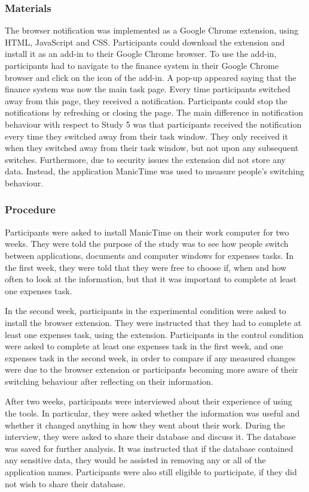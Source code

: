 \subsubsection{Materials}
The browser notification was implemented as a Google Chrome extension, using HTML, JavaScript and CSS. Participants could download the extension and install it as an add-in to their Google Chrome browser. To use the add-in, participants had to navigate to the finance system in their Google Chrome browser and click on the icon of the add-in. A pop-up appeared saying that the finance system was now the main task page. Every time participants switched away from this page, they received a notification. Participants could stop the notifications by refreshing or closing the page. 
The main difference in notification behaviour with respect to Study 5 was that participants received the notification every time they switched away from their task window. They only received it when they switched away from their task window, but not upon any subsequent switches. Furthermore, due to security issues the extension did not store any data. Instead, the application ManicTime was used to measure people's switching behaviour. 

\subsubsection{Procedure}
Participants were asked to install ManicTime on their work computer for two weeks. They were told the purpose of the study was to see how people switch between applications, documents and computer windows for expenses tasks. In the first week, they were told that they were free to choose if, when and how often to look at the information, but that it was important to complete at least one expenses task.

In the second week, participants in the experimental condition were asked to install the browser extension. They were instructed that they had to complete at least one expenses task, using the extension. Participants in the control condition were asked to complete at least one expenses task in the first week, and one expenses task in the second week, in order to compare if any measured changes were due to the browser extension or participants becoming more aware of their switching behaviour after reflecting on their information. 

After two weeks, participants were interviewed about their experience of using the tools. In particular, they were asked whether the information was useful and whether it changed anything in how they went about their work. During the interview, they were asked to share their database and discuss it. The database was saved for further analysis. It was instructed that if the database contained any sensitive data, they would be assisted in removing any or all of the application names. Participants were also still eligible to participate, if they did not wish to share their database.

